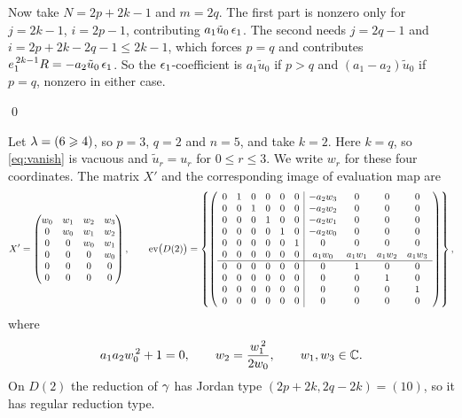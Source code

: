 \documentclass[11pt]{article}
\numberwithin{equation}{section}
\begin{document}
\begin{appendix}
Now take $N=2p+2k-1$ and $m=2q$. The first part is nonzero only for $j=2k-1$,
$i=2p-1$, contributing $a_1\tilde u_0\,\epsilon_1$. The second needs $j=2q-1$ and
$i=2p+2k-2q-1\leqslant 2k-1$, which forces $p=q$ and contributes
$e_1^{\,2k-1}R=-a_2\tilde u_0\,\epsilon_1$. So the $\epsilon_1$-coefficient is
$a_1\tilde u_0$ if $p>q$ and $(a_1-a_2)\tilde u_0$ if $p=q$, nonzero in either
case.

\qed
\begin{exa}
Let $\lambda=(6\geqslant4)$, so $p=3$, $q=2$ and $n=5$, and take $k=2$. Here
$k=q$, so \eqref{eq:vanish} is vacuous and $\tilde u_r=u_r$ for
$0\leqslant r\leqslant3$. We write $w_r$ for these four coordinates. The
matrix $X'$ and the corresponding image of evaluation map are
\[
X'=
\begin{pmatrix}
w_0&w_1&w_2&w_3\\
0&w_0&w_1&w_2\\
0&0&w_0&w_1\\
0&0&0&w_0\\
0&0&0&0\\
0&0&0&0
\end{pmatrix},
\qquad
\operatorname{ev}\bigl(D(2)\bigr)=
\left\{
\left(\begin{array}{cccccc|cccc}
0&1&0&0&0&0&-a_2w_3&0&0&0\\
0&0&1&0&0&0&-a_2w_2&0&0&0\\
0&0&0&1&0&0&-a_2w_1&0&0&0\\
0&0&0&0&1&0&-a_2w_0&0&0&0\\
0&0&0&0&0&1&0&0&0&0\\
0&0&0&0&0&0&a_1w_0&a_1w_1&a_1w_2&a_1w_3\\\hline
0&0&0&0&0&0&0&1&0&0\\
0&0&0&0&0&0&0&0&1&0\\
0&0&0&0&0&0&0&0&0&1\\
0&0&0&0&0&0&0&0&0&0
\end{array}\right)
\right\},
\]
where
\[
a_1a_2w_0^{\,2}+1=0,
\qquad
w_2=\frac{w_1^{\,2}}{2w_0},
\qquad
w_1,w_3\in\mathbb{C} .
\] On $D(2)$ the reduction
of $\gamma$ has Jordan type $(2p+2k,2q-2k)=(10)$, so it has regular reduction type.
\end{exa}
\end{appendix}

\printbibliography
\end{document}
